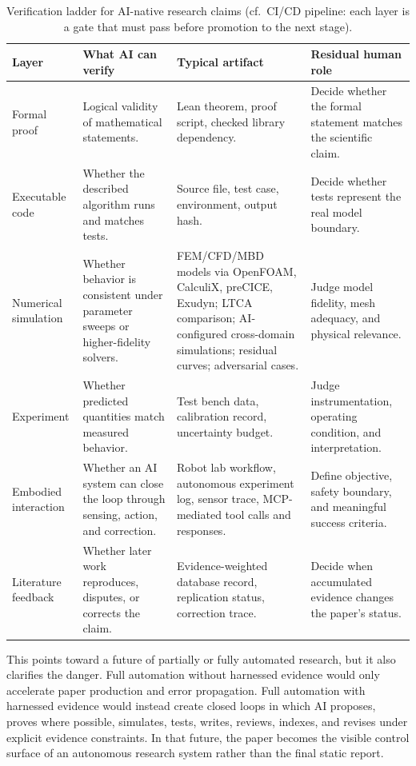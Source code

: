 \documentclass{article}
\begin{document}
\begin{table}[t]
\caption{Verification ladder for AI-native research claims (cf.\ CI/CD pipeline: each layer is a gate that must pass before promotion to the next stage).}
\centering
\small
\begin{tabular}{p{2.6cm}p{4.1cm}p{3.8cm}p{3.1cm}}
\toprule
\textbf{Layer} & \textbf{What AI can verify} & \textbf{Typical artifact} & \textbf{Residual human role} \\
\midrule
Formal proof & Logical validity of mathematical statements. & Lean theorem, proof script, checked library dependency. & Decide whether the formal statement matches the scientific claim. \\
Executable code & Whether the described algorithm runs and matches tests. & Source file, test case, environment, output hash. & Decide whether tests represent the real model boundary. \\
Numerical simulation & Whether behavior is consistent under parameter sweeps or higher-fidelity solvers. & FEM/CFD/MBD models via OpenFOAM, CalculiX, preCICE, Exudyn; LTCA comparison; AI-configured cross-domain simulations; residual curves; adversarial cases. & Judge model fidelity, mesh adequacy, and physical relevance. \\
Experiment & Whether predicted quantities match measured behavior. & Test bench data, calibration record, uncertainty budget. & Judge instrumentation, operating condition, and interpretation. \\
Embodied interaction & Whether an AI system can close the loop through sensing, action, and correction. & Robot lab workflow, autonomous experiment log, sensor trace, MCP-mediated tool calls and responses. & Define objective, safety boundary, and meaningful success criteria. \\
Literature feedback & Whether later work reproduces, disputes, or corrects the claim. & Evidence-weighted database record, replication status, correction trace. & Decide when accumulated evidence changes the paper's status. \\
\bottomrule
\end{tabular}
\label{tab:verification_ladder}
\end{table}

This points toward a future of partially or fully automated research, but it also clarifies the danger. Full automation without harnessed evidence would only accelerate paper production and error propagation. Full automation with harnessed evidence would instead create closed loops in which AI proposes, proves where possible, simulates, tests, writes, reviews, indexes, and revises under explicit evidence constraints. In that future, the paper becomes the visible control surface of an autonomous research system rather than the final static report.
\end{document}
